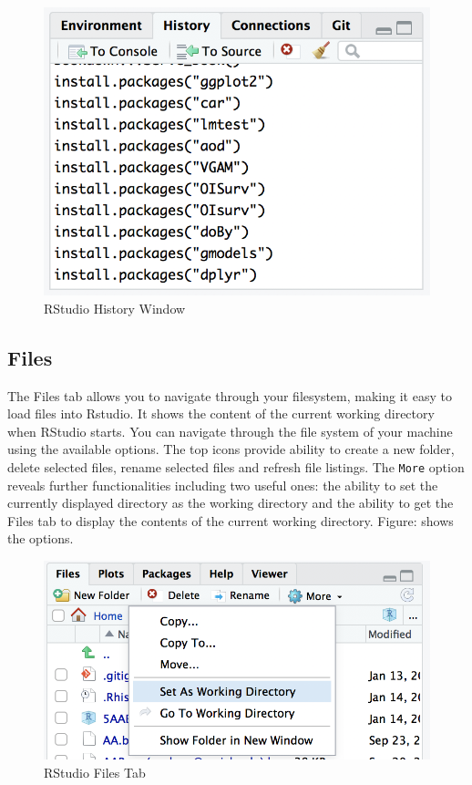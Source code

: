 \documentclass[]{krantz}
\begin{document}
\begin{figure}

{\centering \includegraphics[width=0.5\linewidth]{images/history} 

}

\caption{RStudio History Window}\label{fig:unnamed-chunk-5}
\end{figure}

\subsection{Files}\label{files}

The Files tab allows you to navigate through your filesystem, making it
easy to load files into Rstudio. It shows the content of the current
working directory when RStudio starts. You can navigate through the file
system of your machine using the available options. The top icons
provide ability to create a new folder, delete selected files, rename
selected files and refresh file listings. The \texttt{More} option
reveals further functionalities including two useful ones: the ability
to set the currently displayed directory as the working directory and
the ability to get the Files tab to display the contents of the current
working directory. Figure: shows the options.

\begin{figure}

{\centering \includegraphics[width=0.5\linewidth]{images/files} 

}

\caption{RStudio Files Tab}\label{fig:unnamed-chunk-6}
\end{figure}
\end{document}
